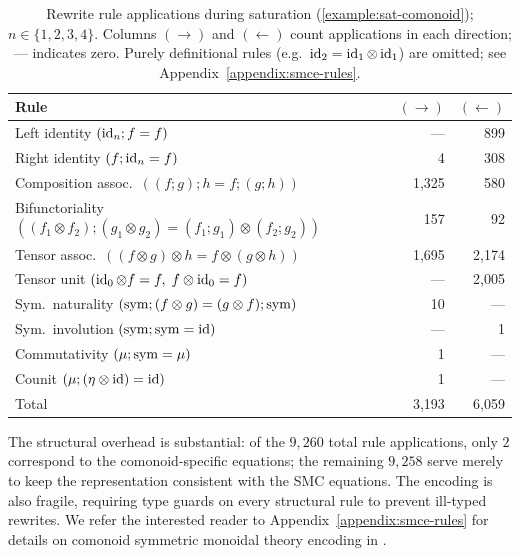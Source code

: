 \begin{table}[h]
\centering
\small
\begin{tabular}{@{}lrr@{}}
\toprule
Rule & $(\to)$ & $(\leftarrow)$ \\
\midrule
Left identity \hfill $(\operatorname{id}_n ; f = f)$ & --- & 899 \\
Right identity \hfill $(f ; \operatorname{id}_n = f)$ & 4 & 308 \\
Composition assoc.\ \hfill $((f;g);h = f;(g;h))$ & 1{,}325 & 580 \\
Bifunctoriality \hfill $((f_1 \otimes f_2);(g_1 \otimes g_2) = (f_1;g_1) \otimes (f_2;g_2))$ & 157 & 92 \\
Tensor assoc.\ \hfill $((f \otimes g) \otimes h = f \otimes (g \otimes h))$ & 1{,}695 & 2{,}174 \\
Tensor unit \hfill $(\operatorname{id}_0 \otimes f = f,\; f \otimes \operatorname{id}_0 = f)$ & --- & 2{,}005 \\
Sym.\ naturality \hfill $(\operatorname{sym};(f \otimes g) = (g \otimes f);\operatorname{sym})$ & 10 & --- \\
Sym.\ involution \hfill $(\operatorname{sym};\operatorname{sym} = \operatorname{id})$ & --- & 1 \\
Commutativity \hfill $(\mu;\operatorname{sym} = \mu)$ & 1 & --- \\
Counit \hfill $(\mu;(\eta \otimes \operatorname{id}) = \operatorname{id})$ & 1 & --- \\
\midrule
Total & 3{,}193 & 6{,}059 \\
\bottomrule
\end{tabular}
\caption{Rewrite rule applications during saturation (\cref{example:sat-comonoid}); $n \in \{1,2,3,4\}$. Columns $(\to)$ and $(\leftarrow)$ count applications in each direction; --- indicates zero. Purely definitional rules (e.g.\ $\operatorname{id}_2 = \operatorname{id}_1 \otimes \operatorname{id}_1$) are omitted; see Appendix~\ref{appendix:smce-rules}.}
\label{tab:comonoid-rules}
\end{table}

The structural overhead is substantial: of the $9{,}260$ total rule applications, only $2$ correspond to the comonoid-specific equations; the remaining $9{,}258$ serve merely to keep the representation consistent with the SMC equations.
The encoding is also fragile, requiring type guards on every structural rule to prevent ill-typed rewrites.
We refer the interested reader to Appendix~\ref{appendix:smce-rules} for details on comonoid symmetric monoidal theory encoding in \egg.

